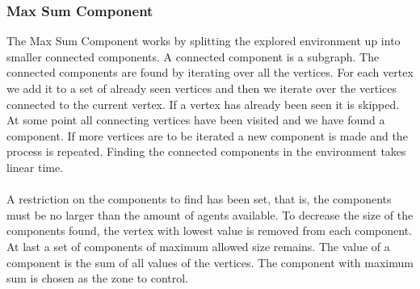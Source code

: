 \documentclass[11pt]{article}
\begin{document}
\subsubsection{Max Sum Component}
The Max Sum Component works by splitting the explored environment up into smaller connected components. A connected component is a subgraph. The connected components are found by iterating over all the vertices. For each vertex we add it to a set of already seen vertices and then we iterate over the vertices connected to the current vertex. If a vertex has already been seen it is skipped. At some point all connecting vertices have been visited and we have found a component. If more vertices are to be iterated a new component is made and the process is repeated. Finding the connected components in the environment takes linear time.\\
\\
A restriction on the components to find has been set, that is, the components must be no larger than the amount of agents available. To decrease the size of the components found, the vertex with lowest value is removed from each component. At last a set of components of maximum allowed size remains. The value of a component is the sum of all values of the vertices. The component with maximum sum is chosen as the zone to control.
\end{document}
